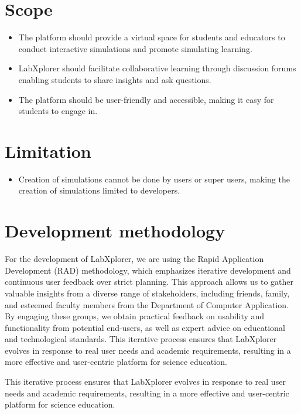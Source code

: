 \section{Scope}

\begin{itemize}
    \item The platform should provide a virtual space for students and educators to conduct interactive simulations and promote simulating learning.
    \item LabXplorer should facilitate collaborative learning through discussion forums enabling students to share insights and ask questions.
    \item The platform should be user-friendly and accessible, making it easy for students to engage in.
    
\end{itemize}
\section{Limitation}

\begin{itemize}
    \item Creation of simulations cannot be done by users or super users, making the creation of simulations limited to developers.
    
    
\end{itemize}
\section{Development methodology}
For the development of LabXplorer, we are using the Rapid Application Development (RAD) methodology, which emphasizes iterative development and continuous user feedback over strict planning. This approach allows us to gather valuable insights from a diverse range of stakeholders, including friends, family, and esteemed faculty members from the Department of Computer Application. By engaging these groups, we obtain practical feedback on usability and functionality from potential end-users, as well as expert advice on educational and technological standards. This iterative process ensures that LabXplorer evolves in response to real user needs and academic requirements, resulting in a more effective and user-centric platform for science education.

This iterative process ensures that LabXplorer evolves in response to real user needs and academic requirements, resulting in a more effective and user-centric platform for science education.
